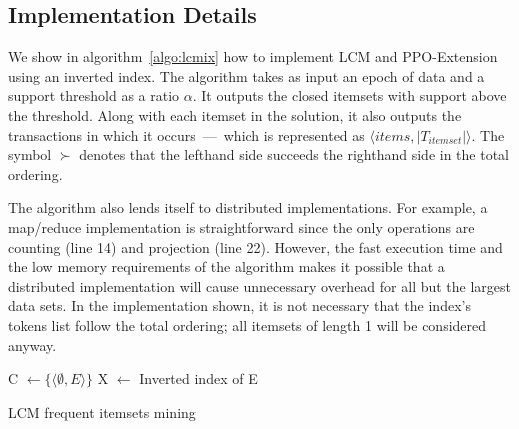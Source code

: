 \documentclass{sig-alternate}
\begin{document}
\subsection{Implementation Details}
We show in algorithm~\ref{algo:lcmix} how to implement LCM and PPO-Extension
using an inverted index.
The algorithm takes as input an epoch of data and a support threshold as a
ratio $\alpha$.
It outputs the closed itemsets with support above the threshold.
Along with each itemset in the solution, it also outputs the transactions
in which it occurs~---~which is represented as $\langle items,
|T_{itemset}| \rangle$.
The symbol $\succ$ denotes that the lefthand side  succeeds the righthand
side in the total ordering.

The algorithm also lends itself to distributed implementations.
For example, a map/reduce implementation is straightforward since the only
operations are counting (line 14) and projection (line 22).
However, the fast execution time and the low memory requirements of the
algorithm makes it possible that a distributed implementation will
cause unnecessary overhead for all but the largest data sets.
In the implementation shown, it is not necessary that the index's tokens list
follow the total ordering; all itemsets of length 1 will be considered anyway. 

\begin{algorithm}
\SetAlgoLined
\LinesNumbered
{}

C $\gets \{\langle \emptyset, E\rangle\}$ 
X $\gets$ Inverted index of E\;
\;


\caption{LCM frequent itemsets mining}
\label{algo:lcmix}
\end{algorithm}
\end{document}
